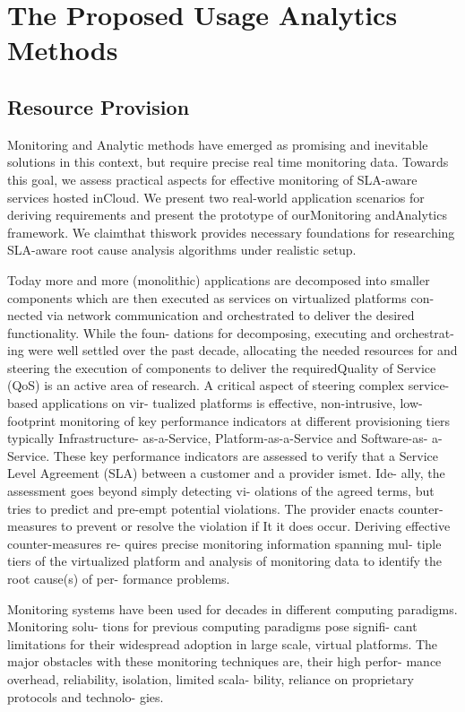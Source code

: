 \section{The Proposed Usage Analytics Methods}

\subsection{Resource Provision}
Monitoring and Analytic methods have emerged as promising and inevitable solutions in this context, but require precise real time monitoring data. Towards this goal, we assess practical aspects for effective monitoring of SLA-aware services hosted inCloud. We present two real-world application scenarios for deriving requirements and present the prototype of ourMonitoring andAnalytics framework. We claimthat thiswork provides necessary foundations for researching SLA-aware root cause analysis algorithms under realistic setup.

Today more and more (monolithic) applications are decomposed into smaller components which are then executed as services on virtualized platforms con- nected via network communication and orchestrated to deliver the desired functionality. While the foun- dations for decomposing, executing and orchestrat- ing were well settled over the past decade, allocating the needed resources for and steering the execution of components to deliver the requiredQuality of Service (QoS) is an active area of research. A critical aspect of steering complex service-based applications on vir- tualized platforms is effective, non-intrusive, low- footprint monitoring of key performance indicators at different provisioning tiers typically Infrastructure- as-a-Service, Platform-as-a-Service and Software-as- a-Service. These key performance indicators are assessed to verify that a Service Level Agreement (SLA) between a customer and a provider ismet. Ide- ally, the assessment goes beyond simply detecting vi- olations of the agreed terms, but tries to predict and pre-empt potential violations. The provider enacts counter-measures to prevent or resolve the violation if
It it does occur. Deriving effective counter-measures re- quires precise monitoring information spanning mul- tiple tiers of the virtualized platform and analysis of monitoring data to identify the root cause(s) of per- formance problems.

Monitoring systems have been used for decades
in different computing paradigms. Monitoring solu- tions for previous computing paradigms pose signifi- cant limitations for their widespread adoption in large scale, virtual platforms. The major obstacles with these monitoring techniques are, their high perfor- mance overhead, reliability, isolation, limited scala- bility, reliance on proprietary protocols and technolo- gies.

